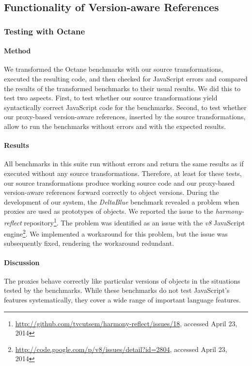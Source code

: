\subsection{Functionality of Version-aware References} \label{sec:EVALUATION:2}


\subsubsection{Testing with Octane}

\paragraph{Method}
We transformed the Octane benchmarks with our source transformations,
executed the resulting code, and then checked for JavaScript errors
and compared the results of the transformed benchmarks to their usual
results. We did this to test two aspects.  First, to test whether our
source transformations yield syntactically correct JavaScript code for
the benchmarks.  Second, to test whether our proxy-based version-aware
references, inserted by the source transformations, allow to run the
benchmarks without errors and with the expected results.


\paragraph{Results}
All benchmarks in this suite run without errors and return the same
results as if executed without any source transformations.  Therefore,
at least for these tests, our source transformations produce working
source code and our proxy-based version-aware references forward
correctly to object versions. During the development of our system,
the \emph{DeltaBlue} benchmark revealed a problem when proxies are
used as prototypes of objects.  We reported the issue to the
\emph{harmony-reflect}
repository\footnote{\url{http://github.com/tvcutsem/harmony-reflect/issues/18},
  accessed April 23, 2014}.  The problem was identified as an issue
with the \emph{v8} JavaScript
engine\footnote{\url{http://code.google.com/p/v8/issues/detail?id=2804},
  accessed April 23, 2014}.  We implemented a workaround for this
problem, but the issue was subsequently fixed, rendering the
workaround redundant.

\paragraph{Discussion}
The proxies behave correctly like particular versions of objects in
the situations tested by the benchmarks.  While these benchmarks do
not test JavaScript's features systematically, they cover a wide range
of important language features.


